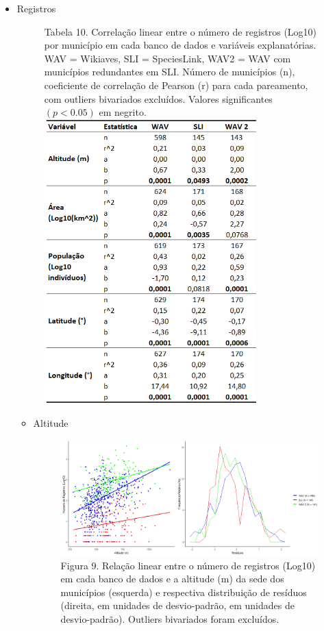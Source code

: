 \begin{itemize}

\item Registros

\begin{figure}[h!]
\centering
{\scriptsize Tabela 10. Correlação linear entre o número de registros (Log10) por município em cada banco de dados e variáveis explanatórias. WAV = Wikiaves, SLI = SpeciesLink, WAV2 = WAV com municípios redundantes em SLI. Número de municípios (n), coeficiente de correlação de Pearson (r) para cada pareamento, com outliers bivariados excluídos. Valores significantes $(p < 0.05)$ em negrito. }
\\
\includegraphics[height = 11cm]{Tabelas/10.png}
\end{figure}

\newpage

\begin{itemize}

\item Altitude

\begin{figure}[h!]
\centering
\includegraphics[width = 15cm]{Imagens/31113.png}
\\{\scriptsize Figura 9. Relação linear entre o número de registros (Log10) em cada banco de dados e a altitude (m) da sede dos municípios (esquerda) e respectiva distribuição de resíduos (direita, em unidades de desvio-padrão, em unidades de desvio-padrão). Outliers bivariados foram excluídos. }
\end{figure}



\end{itemize}
\end{itemize}
